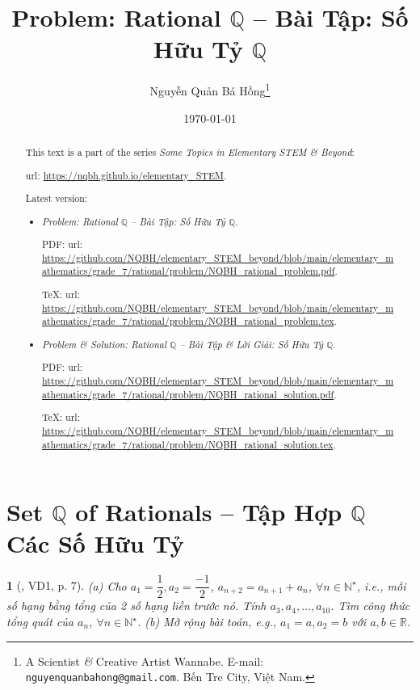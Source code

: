 \documentclass{article}
\title{Problem: Rational $\mathbb{Q}$ -- Bài Tập: Số Hữu Tỷ $\mathbb{Q}$}
\author{Nguyễn Quản Bá Hồng\footnote{A Scientist {\it\&} Creative Artist Wannabe. E-mail: {\tt nguyenquanbahong@gmail.com}. Bến Tre City, Việt Nam.}}
\date{\today}
\newtheorem{baitoan}{}
\begin{document}
\maketitle
\begin{abstract}
	This text is a part of the series {\it Some Topics in Elementary STEM \& Beyond}:
	
	{\sc url}: \url{https://nqbh.github.io/elementary_STEM}.
	
	Latest version:
	\begin{itemize}
		\item {\it Problem: Rational $\mathbb{Q}$ -- Bài Tập: Số Hữu Tỷ $\mathbb{Q}$}.
		
		PDF: {\sc url}: \url{https://github.com/NQBH/elementary_STEM_beyond/blob/main/elementary_mathematics/grade_7/rational/problem/NQBH_rational_problem.pdf}.
		
		\TeX: {\sc url}: \url{https://github.com/NQBH/elementary_STEM_beyond/blob/main/elementary_mathematics/grade_7/rational/problem/NQBH_rational_problem.tex}.
		\item {\it Problem \& Solution: Rational $\mathbb{Q}$ -- Bài Tập \& Lời Giải: Số Hữu Tỷ $\mathbb{Q}$}.
		
		PDF: {\sc url}: \url{https://github.com/NQBH/elementary_STEM_beyond/blob/main/elementary_mathematics/grade_7/rational/problem/NQBH_rational_solution.pdf}.
		
		\TeX: {\sc url}: \url{https://github.com/NQBH/elementary_STEM_beyond/blob/main/elementary_mathematics/grade_7/rational/problem/NQBH_rational_solution.tex}.
	\end{itemize}
\end{abstract}
\tableofcontents


\section{Set $\mathbb{Q}$ of Rationals -- Tập Hợp $\mathbb{Q}$ Các Số Hữu Tỷ}

\begin{baitoan}[\cite{Binh_boi_duong_Toan_7_tap_1}, VD1, p. 7]
	(a) Cho $a_1 = \dfrac{1}{2},a_2 = \dfrac{-1}{2}$, $a_{n+2} = a_{n+1} + a_n$, $\forall n\in\mathbb{N}^\star$, i.e., mỗi số hạng bằng tổng của 2 số hạng liền trước nó. Tính $a_3,a_4,\ldots,a_{10}$. Tìm công thức tổng quát của $a_n$, $\forall n\in\mathbb{N}^\star$. (b) Mở rộng bài toán, e.g., $a_1 = a,a_2 = b$ với $a,b\in\mathbb{R}$.
\end{baitoan}
\end{document}
